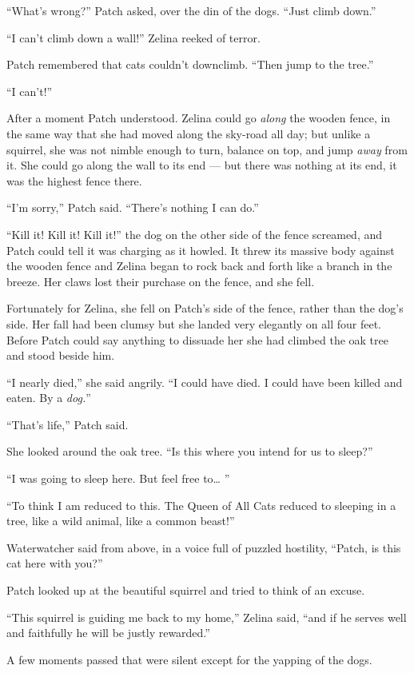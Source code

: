 \documentclass[12pt]{memoir}
\begin{document}
“What’s wrong?” Patch asked, over the din of the dogs. “Just climb
down.”

“I can’t climb down a wall!” Zelina reeked of terror.

Patch remembered that cats couldn’t downclimb. “Then jump to the
tree.”

“I can’t!”

After a moment Patch understood. Zelina could go \textit{along} the
wooden fence, in the same way that she had moved along the sky-road
all day; but unlike a squirrel, she was not nimble enough to turn,
balance on top, and jump \textit{away} from it. She could go along the
wall to its end — but there was nothing at its end, it was the highest
fence there.

“I’m sorry,” Patch said. “There’s nothing I can do.”

“Kill it! Kill it! Kill it!” the dog on the other side of the fence
screamed, and Patch could tell it was charging as it howled. It threw
its massive body against the wooden fence and Zelina began to rock
back and forth like a branch in the breeze. Her claws lost their
purchase on the fence, and she fell.

Fortunately for Zelina, she fell on Patch’s side of the fence, rather
than the dog’s side. Her fall had been clumsy but she landed very
elegantly on all four feet. Before Patch could say anything to
dissuade her she had climbed the oak tree and stood beside him.

“I nearly died,” she said angrily. “I could have died. I could have
been killed and eaten. By a \textit{dog.}”

“That’s life,” Patch said.

She looked around the oak tree. “Is this where you intend for us to
sleep?”

“I was going to sleep here. But feel free to… ”

“To think I am reduced to this. The Queen of All Cats reduced to
sleeping in a tree, like a wild animal, like a common beast!”

Waterwatcher said from above, in a voice full of puzzled hostility,
“Patch, is this cat here with you?”

Patch looked up at the beautiful squirrel and tried to think of an
excuse.

“This squirrel is guiding me back to my home,” Zelina said, “and if he
serves well and faithfully he will be justly rewarded.”

A few moments passed that were silent except for the yapping of the
dogs.
\end{document}
